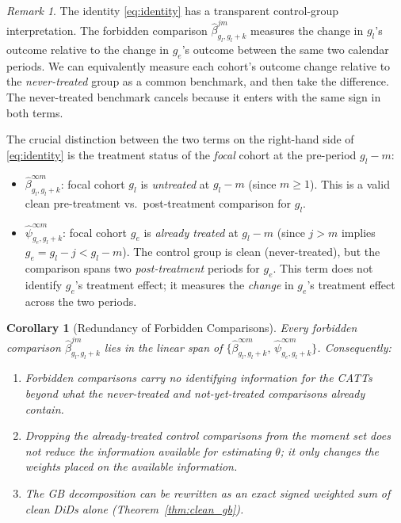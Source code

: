 \documentclass[12pt,letterpaper]{article}
\newtheorem{corollary}[theorem]{Corollary}
\theoremstyle{remark}
\newtheorem{remark}{Remark}[section]
\theoremstyle{definition}
\newcommand{\hbeta}{\hat{\beta}}
\newcommand{\hpsi}{\hat{\psi}}     %
\begin{document}
\begin{remark}
  The identity \eqref{eq:identity} has a transparent control-group
  interpretation. The forbidden comparison $\hbeta^{jm}_{g_l,g_l+k}$ measures
  the change in $g_l$'s outcome relative to the change in $g_e$'s outcome
  between the same two calendar periods. We can equivalently measure each
  cohort's outcome change relative to the \emph{never-treated} group as a
  common benchmark, and then take the difference. The never-treated benchmark
  cancels because it enters with the same sign in both terms.

  The crucial distinction between the two terms on the right-hand side of
  \eqref{eq:identity} is the treatment status of the \emph{focal} cohort at the
  pre-period $g_l - m$:
  \begin{itemize}
    \item $\hbeta^{\infty m}_{g_l,g_l+k}$: focal cohort $g_l$ is
      \emph{untreated} at $g_l - m$ (since $m \geq 1$). This is a valid clean
      pre-treatment vs.\ post-treatment comparison for $g_l$.
    \item $\hpsi^{\infty m}_{g_e,g_l+k}$: focal cohort $g_e$ is
      \emph{already treated} at $g_l - m$ (since $j > m$ implies
      $g_e = g_l - j < g_l - m$). The control group is clean (never-treated),
      but the comparison spans two \emph{post-treatment} periods for $g_e$.
      This term does not identify $g_e$'s treatment effect; it measures the
      \emph{change} in $g_e$'s treatment effect across the two periods.
  \end{itemize}
\end{remark}

\begin{corollary}[Redundancy of Forbidden Comparisons]
  \label{cor:redundancy}
  Every forbidden comparison $\hbeta^{jm}_{g_l,g_l+k}$ lies in the linear
  span of $\{\hbeta^{\infty m}_{g_l,g_l+k},\,\hpsi^{\infty m}_{g_e,g_l+k}\}$.
  Consequently:
  \begin{enumerate}
    \item Forbidden comparisons carry no identifying information for the CATTs
      beyond what the never-treated and not-yet-treated comparisons already
      contain.
    \item Dropping the already-treated control comparisons from the moment set
      does not reduce the information available for estimating $\theta$; it
      only changes the weights placed on the available information.
    \item The GB decomposition can be rewritten as an exact signed weighted sum
      of clean DiDs alone (Theorem~\ref{thm:clean_gb}).
  \end{enumerate}
\end{corollary}
\end{document}
